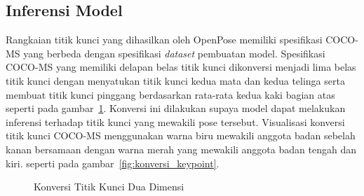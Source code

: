 \subsection{Inferensi Model}

Rangkaian titik kunci yang dihasilkan oleh OpenPose memiliki spesifikasi COCO-MS yang berbeda dengan
spesifikasi \textit{dataset} pembuatan model. Spesifikasi COCO-MS yang memiliki delapan belas titik
kunci dikonversi menjadi lima belas titik kunci dengan menyatukan titik kunci kedua mata dan kedua telinga
serta membuat titik kunci pinggang berdasarkan rata-rata kedua kaki bagian atas seperti pada
gambar~\ref{fig:konversi}. Konversi ini dilakukan supaya model dapat melakukan inferensi terhadap
titik kunci yang mewakili pose tersebut. Visualisasi konversi titik kunci COCO-MS menggunakan warna
biru mewakili anggota badan sebelah kanan bersamaan dengan warna merah yang mewakili anggota badan
tengah dan kiri. seperti pada gambar~\ref{fig:konversi_keypoint}.

\begin{figure}[htbp]
    \begin{center}
    \end{center}
    \vspace{-20pt}
    \captionsetup{labelfont=bf, textfont=bf}
    \caption{Konversi Titik Kunci Dua Dimensi}
    \vspace{-10pt}
    \captionsetup{labelfont=md, textfont=md}
    \label{fig:konversi}
\end{figure}

